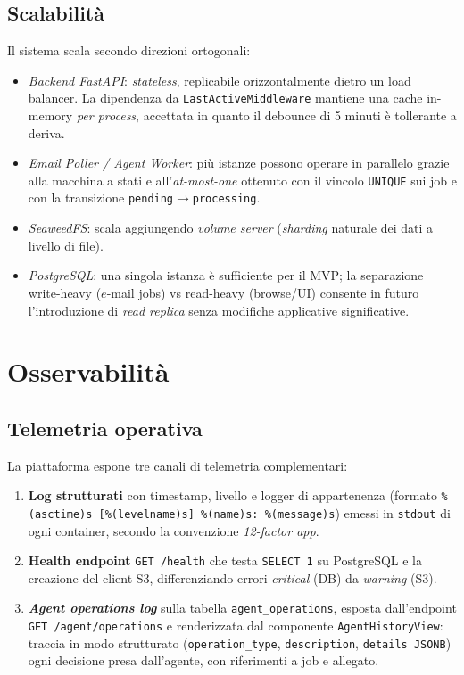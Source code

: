 \documentclass[11pt,a4paper,oneside]{article}
\begin{document}
\subsection{Scalabilit\`a}
Il sistema scala secondo direzioni ortogonali:
\begin{itemize}[leftmargin=*]
    \item \emph{Backend FastAPI}: \emph{stateless}, replicabile orizzontalmente
          dietro un load balancer. La dipendenza da \texttt{LastActiveMiddleware}
          mantiene una cache in-memory \emph{per process}, accettata in quanto
          il debounce di 5 minuti \`e tollerante a deriva.
    \item \emph{Email Poller / Agent Worker}: pi\`u istanze possono operare in
          parallelo grazie alla macchina a stati e all'\emph{at-most-one}
          ottenuto con il vincolo \texttt{UNIQUE} sui job e con la transizione
          \texttt{pending}$\rightarrow$\texttt{processing}.
    \item \emph{SeaweedFS}: scala aggiungendo \emph{volume server}
          (\emph{sharding} naturale dei dati a livello di file).
    \item \emph{PostgreSQL}: una singola istanza \`e sufficiente per il MVP;
          la separazione write-heavy ($e$-mail jobs) vs read-heavy
          (browse/UI) consente in futuro l'introduzione di \emph{read replica}
          senza modifiche applicative significative.
\end{itemize}

\section{Osservabilit\`a}

\subsection{Telemetria operativa}
La piattaforma espone tre canali di telemetria complementari:
\begin{enumerate}[leftmargin=*]
    \item \textbf{Log strutturati} con timestamp, livello e logger di
          appartenenza (formato \texttt{\%(asctime)s [\%(levelname)s] \%(name)s:
          \%(message)s}) emessi in \texttt{stdout} di ogni container, secondo
          la convenzione \emph{12-factor app}.
    \item \textbf{Health endpoint} \texttt{GET /health} che testa
          \texttt{SELECT 1} su PostgreSQL e la creazione del client S3,
          differenziando errori \emph{critical} (DB) da \emph{warning} (S3).
    \item \textbf{\emph{Agent operations log}} sulla tabella
          \texttt{agent\_operations}, esposta dall'endpoint
          \texttt{GET /agent/operations} e renderizzata dal componente
          \texttt{AgentHistoryView}: traccia in modo strutturato
          (\texttt{operation\_type}, \texttt{description}, \texttt{details JSONB})
          ogni decisione presa dall'agente, con riferimenti a job e allegato.
\end{enumerate}
\end{document}
